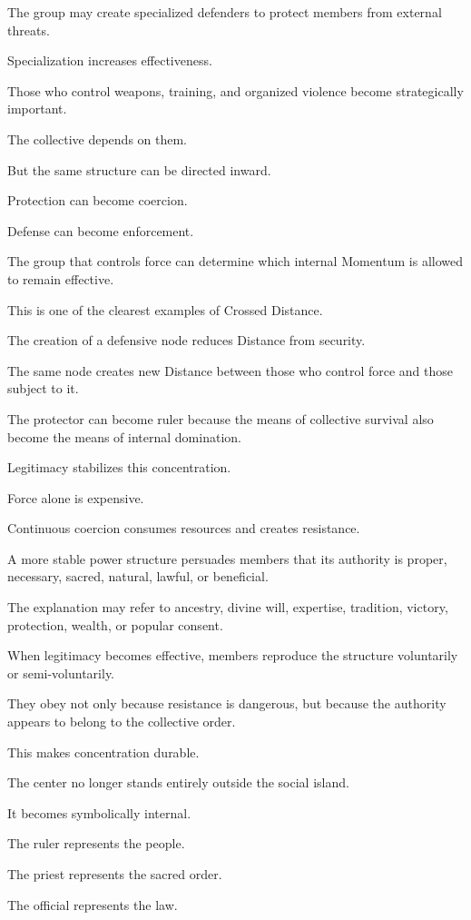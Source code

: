 The group may create specialized defenders to protect members from external threats.

Specialization increases effectiveness.

Those who control weapons, training, and organized violence become strategically important.

The collective depends on them.

But the same structure can be directed inward.

Protection can become coercion.

Defense can become enforcement.

The group that controls force can determine which internal Momentum is allowed to remain effective.

This is one of the clearest examples of Crossed Distance.

The creation of a defensive node reduces Distance from security.

The same node creates new Distance between those who control force and those subject to it.

The protector can become ruler because the means of collective survival also become the means of internal domination.

Legitimacy stabilizes this concentration.

Force alone is expensive.

Continuous coercion consumes resources and creates resistance.

A more stable power structure persuades members that its authority is proper, necessary, sacred, natural, lawful, or beneficial.

The explanation may refer to ancestry, divine will, expertise, tradition, victory, protection, wealth, or popular consent.

When legitimacy becomes effective, members reproduce the structure voluntarily or semi-voluntarily.

They obey not only because resistance is dangerous, but because the authority appears to belong to the collective order.

This makes concentration durable.

The center no longer stands entirely outside the social island.

It becomes symbolically internal.

The ruler represents the people.

The priest represents the sacred order.

The official represents the law.

